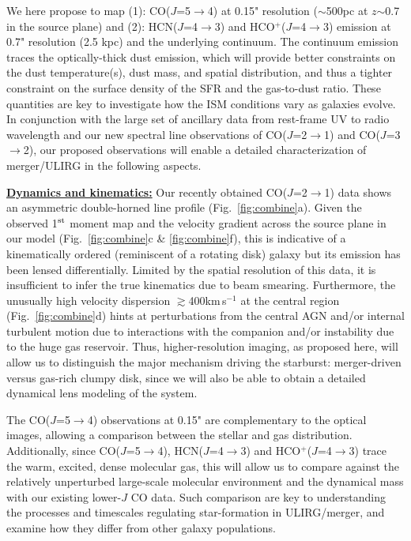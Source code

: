 \documentclass[12pt,a4paper]{article}  %
\newcommand{\rarr}{$\rightarrow$}
\newcommand{\bco}{\mbox{CO($J$=2\rarr1)}\xspace}
\newcommand{\eco}{\mbox{CO($J$=5\rarr4)}\xspace}
\newcommand{\rot}[3][HCN]{\mbox{#1($J$=#2\rarr#3)}\xspace}
\newcommand{\dhcn}{HCN($J$=4\rarr3)\xspace}
\newcommand{\dhcop}{HCO$^+$($J$=4\rarr3)\xspace}
\newcommand{\kms}{km\,s$^{-1}$\xspace}
\newcommand{\Fig}[1]{Fig.~\ref{fig:#1}}
\begin{document}
We here propose to map (1): \eco at 0.15" resolution ($\sim$500pc at $z$$\sim$0.7 in the source plane) and 
(2): \dhcn and \dhcop emission at 0.7" resolution (2.5 kpc) and the underlying continuum.
The continuum emission traces the optically-thick dust emission, which 
will provide better constraints on the dust temperature(s), dust mass,
and spatial distribution, and thus a tighter constraint on the surface density of the SFR and 
the gas-to-dust ratio. These quantities are key to investigate how the ISM conditions 
vary as galaxies evolve.
In conjunction with the large set of ancillary data from
rest-frame UV to radio wavelength and our new spectral line observations of \bco and \rot[CO]{3}{2}, our
proposed observations will enable a detailed characterization of 
merger/ULIRG in the following aspects.

\underline{\bf Dynamics and kinematics:}
Our recently obtained \bco data shows an asymmetric double-horned line profile (\Fig{combine}a). Given
the observed 1$^{\rm st}$ moment map and the velocity gradient
across the source plane in our model (\Fig{combine}c \& \ref{fig:combine}f), this is indicative of
a kinematically ordered (reminiscent of a rotating disk) galaxy but its emission 
has been lensed differentially. 
Limited by the spatial resolution of this data, it is insufficient to infer the true 
kinematics due to beam smearing.
Furthermore, the unusually high velocity dispersion 
$\gtrsim$400\kms at the central region (\Fig{combine}d) hints at 
perturbations from the central AGN and/or
internal turbulent motion due to interactions with the companion
and/or instability due to the huge gas reservoir.
Thus, higher-resolution imaging, as proposed here, will allow us to
distinguish the major mechanism driving the starburst: merger-driven 
versus gas-rich clumpy disk, since we will also be able to obtain a detailed
dynamical lens modeling of the system.

The \eco observations at 0.15" are complementary to the optical images,
allowing a comparison between the stellar and gas distribution. 
Additionally, since \eco, \dhcn and \dhcop trace the warm, excited, dense molecular gas,
this will allow us to compare against the relatively unperturbed large-scale 
molecular environment and the dynamical mass with our existing lower-$J$ CO data.
Such comparison are key to understanding the processes and timescales regulating star-formation 
in ULIRG/merger, and examine how they differ from other galaxy populations.
\end{document}

